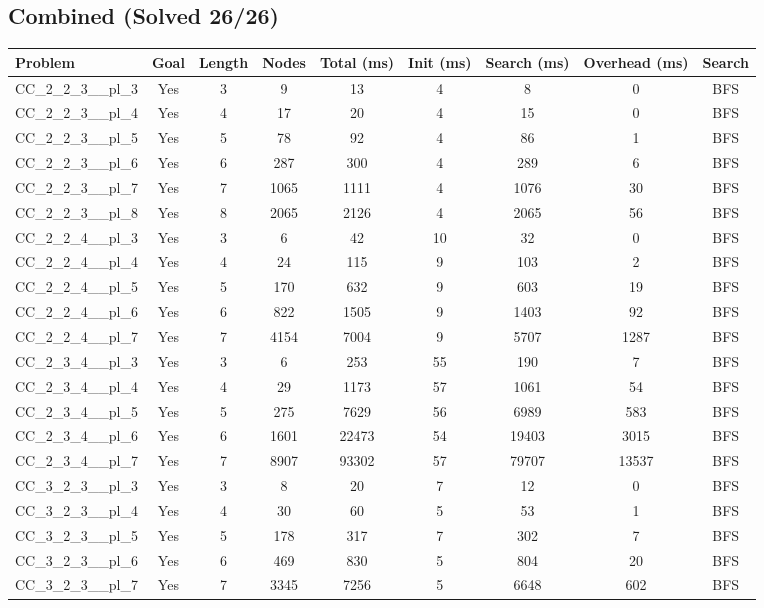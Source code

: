 \documentclass{article}
\begin{document}
\subsection*{Combined (Solved 26/26)}
\begin{tabular}{lcccccccc}
\toprule
Problem & Goal & Length & Nodes & Total (ms) & Init (ms) & Search (ms) & Overhead (ms) & Search \\
\midrule
CC\_2\_2\_3\_\_pl\_3 & Yes & 3 & 9 & 13 & 4 & 8 & 0 & BFS \\
CC\_2\_2\_3\_\_pl\_4 & Yes & 4 & 17 & 20 & 4 & 15 & 0 & BFS \\
CC\_2\_2\_3\_\_pl\_5 & Yes & 5 & 78 & 92 & 4 & 86 & 1 & BFS \\
CC\_2\_2\_3\_\_pl\_6 & Yes & 6 & 287 & 300 & 4 & 289 & 6 & BFS \\
CC\_2\_2\_3\_\_pl\_7 & Yes & 7 & 1065 & 1111 & 4 & 1076 & 30 & BFS \\
CC\_2\_2\_3\_\_pl\_8 & Yes & 8 & 2065 & 2126 & 4 & 2065 & 56 & BFS \\
CC\_2\_2\_4\_\_pl\_3 & Yes & 3 & 6 & 42 & 10 & 32 & 0 & BFS \\
CC\_2\_2\_4\_\_pl\_4 & Yes & 4 & 24 & 115 & 9 & 103 & 2 & BFS \\
CC\_2\_2\_4\_\_pl\_5 & Yes & 5 & 170 & 632 & 9 & 603 & 19 & BFS \\
CC\_2\_2\_4\_\_pl\_6 & Yes & 6 & 822 & 1505 & 9 & 1403 & 92 & BFS \\
CC\_2\_2\_4\_\_pl\_7 & Yes & 7 & 4154 & 7004 & 9 & 5707 & 1287 & BFS \\
CC\_2\_3\_4\_\_pl\_3 & Yes & 3 & 6 & 253 & 55 & 190 & 7 & BFS \\
CC\_2\_3\_4\_\_pl\_4 & Yes & 4 & 29 & 1173 & 57 & 1061 & 54 & BFS \\
CC\_2\_3\_4\_\_pl\_5 & Yes & 5 & 275 & 7629 & 56 & 6989 & 583 & BFS \\
CC\_2\_3\_4\_\_pl\_6 & Yes & 6 & 1601 & 22473 & 54 & 19403 & 3015 & BFS \\
CC\_2\_3\_4\_\_pl\_7 & Yes & 7 & 8907 & 93302 & 57 & 79707 & 13537 & BFS \\
CC\_3\_2\_3\_\_pl\_3 & Yes & 3 & 8 & 20 & 7 & 12 & 0 & BFS \\
CC\_3\_2\_3\_\_pl\_4 & Yes & 4 & 30 & 60 & 5 & 53 & 1 & BFS \\
CC\_3\_2\_3\_\_pl\_5 & Yes & 5 & 178 & 317 & 7 & 302 & 7 & BFS \\
CC\_3\_2\_3\_\_pl\_6 & Yes & 6 & 469 & 830 & 5 & 804 & 20 & BFS \\
CC\_3\_2\_3\_\_pl\_7 & Yes & 7 & 3345 & 7256 & 5 & 6648 & 602 & BFS \\

\end{tabular}
\end{document}
